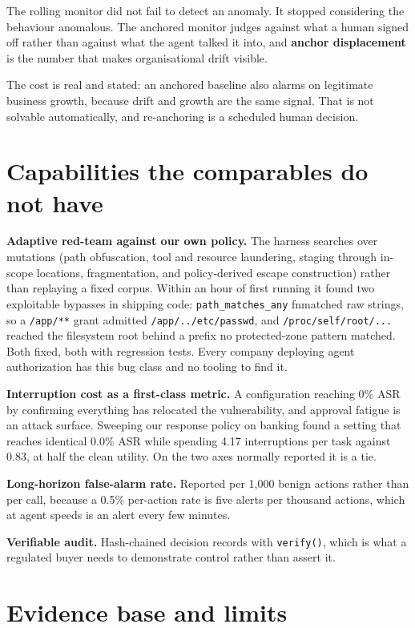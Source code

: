 \documentclass[11pt]{article}
\begin{document}
The rolling monitor did not fail to detect an anomaly. It stopped considering
the behaviour anomalous. The anchored monitor judges against what a human signed
off rather than against what the agent talked it into, and \textbf{anchor
displacement} is the number that makes organisational drift visible.

The cost is real and stated: an anchored baseline also alarms on legitimate
business growth, because drift and growth are the same signal. That is not
solvable automatically, and re-anchoring is a scheduled human decision.

\section{Capabilities the comparables do not have}

\textbf{Adaptive red-team against our own policy.} The harness searches over
mutations (path obfuscation, tool and resource laundering, staging through
in-scope locations, fragmentation, and policy-derived escape construction)
rather than replaying a fixed corpus. Within an hour of first running it found
two exploitable bypasses in shipping code: \texttt{path\_matches\_any} fnmatched
raw strings, so a \texttt{/app/**} grant admitted \texttt{/app/../etc/passwd},
and \texttt{/proc/self/root/...} reached the filesystem root behind a prefix no
protected-zone pattern matched. Both fixed, both with regression tests. Every
company deploying agent authorization has this bug class and no tooling to find
it.

\textbf{Interruption cost as a first-class metric.} A configuration reaching 0\%
ASR by confirming everything has relocated the vulnerability, and approval
fatigue is an attack surface. Sweeping our response policy on banking found a
setting that reaches identical 0.0\% ASR while spending 4.17 interruptions per
task against 0.83, at half the clean utility. On the two axes normally reported
it is a tie.

\textbf{Long-horizon false-alarm rate.} Reported per 1,000 benign actions rather
than per call, because a 0.5\% per-action rate is five alerts per thousand
actions, which at agent speeds is an alert every few minutes.

\textbf{Verifiable audit.} Hash-chained decision records with \texttt{verify()},
which is what a regulated buyer needs to demonstrate control rather than assert
it.

\section{Evidence base and limits}
\end{document}
